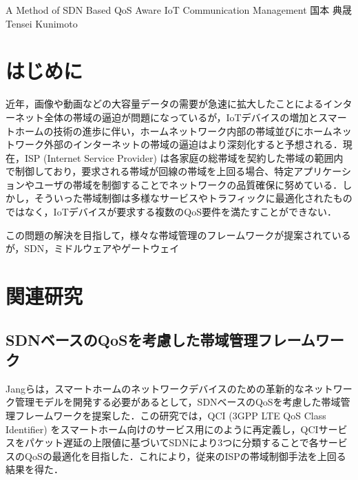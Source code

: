\documentclass[a4paper,10pt,twocolumn,uplatex]{jsarticle}
\date{13}
\begin{document}
{A Method of SDN Based QoS Aware IoT Communication Management}
{国本 典晟}
{Tensei Kunimoto}

\section{はじめに}
近年，画像や動画などの大容量データの需要が急速に拡大したことによるインターネット全体の帯域の逼迫が問題になっているが，IoTデバイスの増加とスマートホームの技術の進歩に伴い，ホームネットワーク内部の帯域並びにホームネットワーク外部のインターネットの帯域の逼迫はより深刻化すると予想される．現在，ISP (Internet Service Provider) は各家庭の総帯域を契約した帯域の範囲内で制御しており，要求される帯域が回線の帯域を上回る場合、特定アプリケーションやユーザの帯域を制御することでネットワークの品質確保に努めている\cite{guideline}．しかし，そういった帯域制御は多様なサービスやトラフィックに最適化されたものではなく，IoTデバイスが要求する複数のQoS要件を満たすことができない．\par
この問題の解決を目指して，様々な帯域管理のフレームワークが提案されているが，SDN，ミドルウェアやゲートウェイ

\section{関連研究}

\subsection{SDNベースのQoSを考慮した帯域管理フレームワーク}
Jangらは，スマートホームのネットワークデバイスのための革新的なネットワーク管理モデルを開発する必要があるとして，SDNベースのQoSを考慮した帯域管理フレームワークを提案した\cite{framework}．この研究では，QCI (3GPP LTE QoS Class Identifier) をスマートホーム向けのサービス用にのように再定義し，QCIサービスをパケット遅延の上限値に基づいてSDNにより3つに分類することで各サービスのQoSの最適化を目指した．これにより，従来のISPの帯域制御手法を上回る結果を得た．\par
\end{document}
